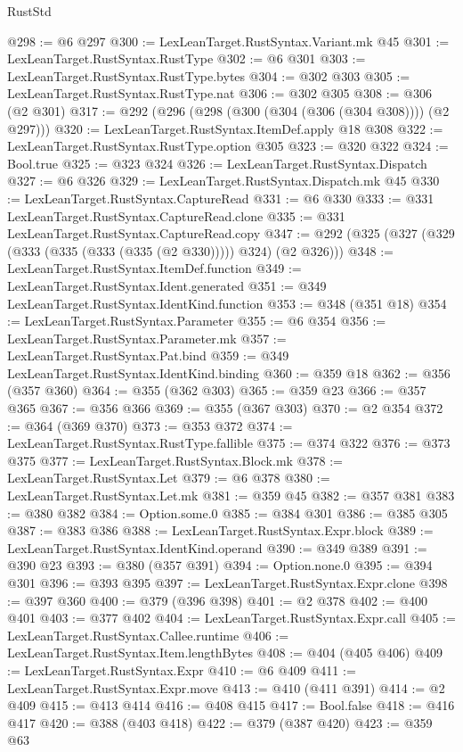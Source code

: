 \begin{lexlean}{RustStd}
\begin{coremodule}
{\begin{coremodule}
{{{{{{{{@298 := @6 @297
@300 := LexLeanTarget.RustSyntax.Variant.mk @45
@301 := LexLeanTarget.RustSyntax.RustType
@302 := @6 @301
@303 := LexLeanTarget.RustSyntax.RustType.bytes
@304 := @302 @303
@305 := LexLeanTarget.RustSyntax.RustType.nat
@306 := @302 @305
@308 := @306 (@2 @301)
@317 := @292 (@296 (@298 (@300 (@304 (@306 (@304 @308)))) (@2 @297)))
@320 := LexLeanTarget.RustSyntax.ItemDef.apply @18 @308
@322 := LexLeanTarget.RustSyntax.RustType.option @305
@323 := @320 @322
@324 := Bool.true
@325 := @323 @324
@326 := LexLeanTarget.RustSyntax.Dispatch
@327 := @6 @326
@329 := LexLeanTarget.RustSyntax.Dispatch.mk @45
@330 := LexLeanTarget.RustSyntax.CaptureRead
@331 := @6 @330
@333 := @331 LexLeanTarget.RustSyntax.CaptureRead.clone
@335 := @331 LexLeanTarget.RustSyntax.CaptureRead.copy
@347 := @292 (@325 (@327 (@329 (@333 (@335 (@333 (@335 (@2 @330))))) @324) (@2 @326)))
@348 := LexLeanTarget.RustSyntax.ItemDef.function
@349 := LexLeanTarget.RustSyntax.Ident.generated
@351 := @349 LexLeanTarget.RustSyntax.IdentKind.function
@353 := @348 (@351 @18)
@354 := LexLeanTarget.RustSyntax.Parameter
@355 := @6 @354
@356 := LexLeanTarget.RustSyntax.Parameter.mk
@357 := LexLeanTarget.RustSyntax.Pat.bind
@359 := @349 LexLeanTarget.RustSyntax.IdentKind.binding
@360 := @359 @18
@362 := @356 (@357 @360)
@364 := @355 (@362 @303)
@365 := @359 @23
@366 := @357 @365
@367 := @356 @366
@369 := @355 (@367 @303)
@370 := @2 @354
@372 := @364 (@369 @370)
@373 := @353 @372
@374 := LexLeanTarget.RustSyntax.RustType.fallible
@375 := @374 @322
@376 := @373 @375
@377 := LexLeanTarget.RustSyntax.Block.mk
@378 := LexLeanTarget.RustSyntax.Let
@379 := @6 @378
@380 := LexLeanTarget.RustSyntax.Let.mk
@381 := @359 @45
@382 := @357 @381
@383 := @380 @382
@384 := Option.some.{0}
@385 := @384 @301
@386 := @385 @305
@387 := @383 @386
@388 := LexLeanTarget.RustSyntax.Expr.block
@389 := LexLeanTarget.RustSyntax.IdentKind.operand
@390 := @349 @389
@391 := @390 @23
@393 := @380 (@357 @391)
@394 := Option.none.{0}
@395 := @394 @301
@396 := @393 @395
@397 := LexLeanTarget.RustSyntax.Expr.clone
@398 := @397 @360
@400 := @379 (@396 @398)
@401 := @2 @378
@402 := @400 @401
@403 := @377 @402
@404 := LexLeanTarget.RustSyntax.Expr.call
@405 := LexLeanTarget.RustSyntax.Callee.runtime
@406 := LexLeanTarget.RustSyntax.Item.lengthBytes
@408 := @404 (@405 @406)
@409 := LexLeanTarget.RustSyntax.Expr
@410 := @6 @409
@411 := LexLeanTarget.RustSyntax.Expr.move
@413 := @410 (@411 @391)
@414 := @2 @409
@415 := @413 @414
@416 := @408 @415
@417 := Bool.false
@418 := @416 @417
@420 := @388 (@403 @418)
@422 := @379 (@387 @420)
@423 := @359 @63
}}}}}}}}
\end{coremodule}}
\end{coremodule}
\end{lexlean}
